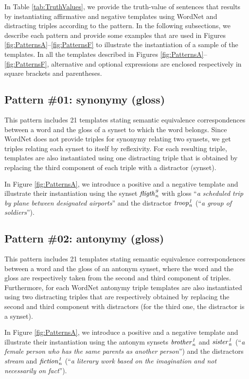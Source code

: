 \documentclass[11pt]{article}
\newcommand{\WORDNET}{WordNet}
\newcommand{\synset}[3]{{\it{#1}_{#3}^{#2}}}
\begin{document}
In Table \ref{tab:TruthValues}, we provide the truth-value of sentences that results by instantiating affirmative and negative templates using \WORDNET{} and distracting triples according to the pattern. In the following subsections, we describe each pattern and provide some examples that are used in Figures \ref{fig:PatternsA}--\ref{fig:PatternsF} to illustrate the instantiation of a sample of the templates. In all the templates described in Figures \ref{fig:PatternsA}--\ref{fig:PatternsF}, alternative and optional expressions are enclosed respectively in square brackets and parentheses.

\subsection{Pattern \#01: synonymy (gloss)}

This pattern includes 21 templates stating semantic equivalence correspondences between a word and the gloss of a synset to which the word belongs. Since \WORDNET{} does not provide triples for synonymy relating two synsets, we get triples relating each synset to itself by reflexivity. For each resulting triple, templates are also instantiated using one distracting triple that is obtained by replacing the third component of each triple with a distractor (synset).

In Figure \ref{fig:PatternsA}, we introduce a positive and a negative template and illustrate their instantiation using the synset $\synset{fligth}{9}{n}$ with gloss ``{\it a scheduled trip by plane between designated airports}'' and the distractor $\synset{troop}{1}{n}$ (``{\it a group of soldiers}'').

\subsection{Pattern \#02: antonymy (gloss)}

This pattern includes 21 templates stating semantic equivalence correspondences between a word and the gloss of an antonym synset, where the word and the gloss are respectively taken from the second and third component of triples. Furthermore, for each \WORDNET{} antonymy triple templates are also instantiated using two distracting triples that are respectively obtained by replacing the second and third component with distractors (for the third one, the distractor is a synset).

In Figure \ref{fig:PatternsA}, we introduce a positive and a negative template and illustrate their instantiation using the antonym synsets $\synset{brother}{1}{n}$ and $\synset{sister}{1}{n}$ (``{\it a female person who has the same parents as another person}'') and the distractors {\it stream} and $\synset{fiction}{1}{n}$ (``{\it a literary work based on the imagination and not necessarily on fact}'').
\end{document}
